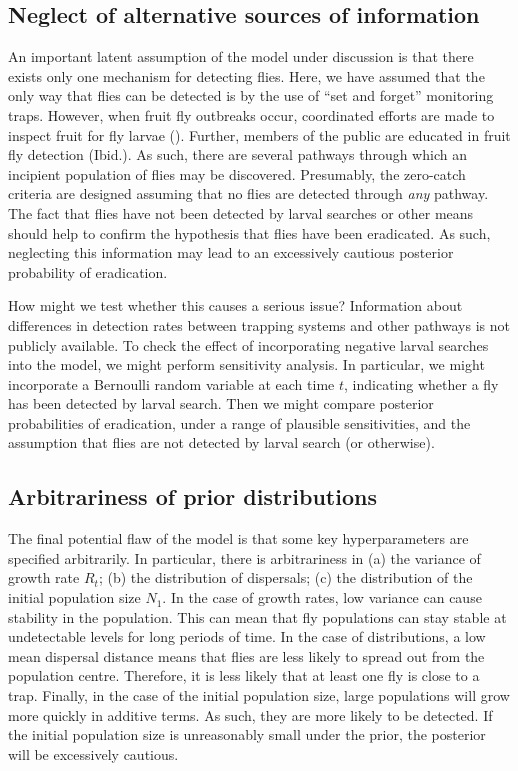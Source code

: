 \documentclass[
  oneside]{book}
\begin{document}
\hypertarget{neglect-of-alternative-sources-of-information}{%
\subsection{Neglect of alternative sources of information}\label{neglect-of-alternative-sources-of-information}}

An important latent assumption of the model under discussion is that there exists only one mechanism for detecting flies. Here, we have assumed that the only way that flies can be detected is by the use of ``set and forget'' monitoring traps. However, when fruit fly outbreaks occur, coordinated efforts are made to inspect fruit for fly larvae (\citet{pirsa}). Further, members of the public are educated in fruit fly detection (Ibid.). As such, there are several pathways through which an incipient population of flies may be discovered. Presumably, the zero-catch criteria are designed assuming that no flies are detected through \emph{any} pathway. The fact that flies have not been detected by larval searches or other means should help to confirm the hypothesis that flies have been eradicated. As such, neglecting this information may lead to an excessively cautious posterior probability of eradication.

How might we test whether this causes a serious issue? Information about differences in detection rates between trapping systems and other pathways is not publicly available. To check the effect of incorporating negative larval searches into the model, we might perform sensitivity analysis. In particular, we might incorporate a Bernoulli random variable at each time \(t\), indicating whether a fly has been detected by larval search. Then we might compare posterior probabilities of eradication, under a range of plausible sensitivities, and the assumption that flies are not detected by larval search (or otherwise).

\hypertarget{arbitrariness-of-prior-distributions}{%
\subsection{Arbitrariness of prior distributions}\label{arbitrariness-of-prior-distributions}}

The final potential flaw of the model is that some key hyperparameters are specified arbitrarily. In particular, there is arbitrariness in (a) the variance of growth rate \(R_t\); (b) the distribution of dispersals; (c) the distribution of the initial population size \(N_1\). In the case of growth rates, low variance can cause stability in the population. This can mean that fly populations can stay stable at undetectable levels for long periods of time. In the case of distributions, a low mean dispersal distance means that flies are less likely to spread out from the population centre. Therefore, it is less likely that at least one fly is close to a trap. Finally, in the case of the initial population size, large populations will grow more quickly in additive terms. As such, they are more likely to be detected. If the initial population size is unreasonably small under the prior, the posterior will be excessively cautious.
\end{document}
